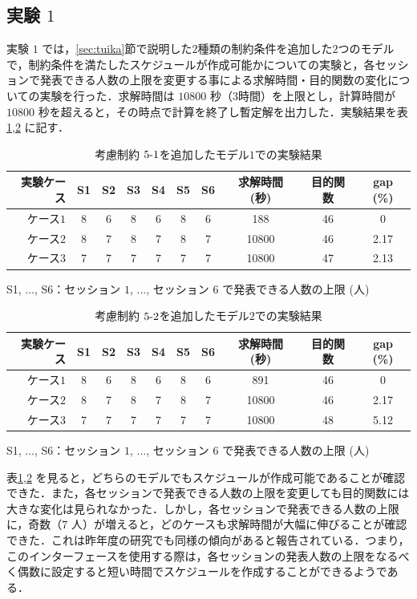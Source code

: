 \documentclass[a4paper,12pt,fleqn]{jarticle}
\begin{document}
\subsection{実験 $1$}\label{sec:jikken1}
実験 $1$ では，\ref{sec:tuika}節で説明した$2$種類の制約条件を追加した$2$つのモデルで，制約条件を満たしたスケジュールが作成可能かについての実験と，各セッションで発表できる人数の上限を変更する事による求解時間・目的関数の変化についての実験を行った．求解時間は $10800$ 秒（$3$時間）を上限とし，計算時間が $10800$ 秒を超えると，その時点で計算を終了し暫定解を出力した．実験結果を表 \ref{tb:jikkenx1},\ref{tb:jikkeny1} に記す．
\begin{table}[H]
  \begin{center}
    \caption{考慮制約 $5\mathchar`-1$を追加したモデル$1$での実験結果}
    \label{tb:jikkenx1}
    \begin{tabular}{r|ccccccccc}  \toprule
    実験ケース &  S1 & S2 & S3 & S4 & S5 & S6 & 求解時間 (秒) & 目的関数 & gap (\%) \\ \toprule 
    ケース$1$ &  8 & 6 & 8 & 6 & 8 & 6 & 188 & 46 & 0 \\ \hline
    ケース$2$ & 8 & 7 & 8 & 7 & 8 & 7 & 10800 & 46 & 2.17 \\ \hline
    ケース$3$ & 7 & 7 & 7 & 7 & 7 & 7 & 10800 & 47& 2.13 \\ \bottomrule
      \end{tabular}
  \end{center}
  S1, ..., S6：セッション $1$, ..., セッション $6$ で発表できる人数の上限 (人)
\end{table}

\begin{table}[H]
  \begin{center}
    \caption{考慮制約 $5\mathchar`-2$を追加したモデル$2$での実験結果}
    \label{tb:jikkeny1}
    \begin{tabular}{r|ccccccccc} \toprule
     実験ケース & S1 & S2 & S3 & S4 & S5 & S6 & 求解時間 (秒) & 目的関数 & gap (\%) \\ \toprule
     ケース$1$ & 8 & 6 & 8 & 6 & 8 & 6 & 891 & 46 & 0 \\ \hline
     ケース$2$ & 8 & 7 & 8 & 7 & 8 & 7 & 10800 & 46 & 2.17 \\ \hline
     ケース$3$ & 7 & 7 & 7 & 7 & 7 & 7 & 10800 & 48  & 5.12 \\ \bottomrule
      \end{tabular}
  \end{center}
  S1, ..., S6：セッション $1$, ..., セッション $6$ で発表できる人数の上限 (人)
\end{table}
 表\ref{tb:jikkenx1},\ref{tb:jikkeny1} を見ると，どちらのモデルでもスケジュールが作成可能であることが確認できた．また，各セッションで発表できる人数の上限を変更しても目的関数には大きな変化は見られなかった．しかし，各セッションで発表できる人数の上限に，奇数（$7$ 人）が増えると，どのケースも求解時間が大幅に伸びることが確認できた．これは昨年度の研究\cite{wakabayasi}でも同様の傾向があると報告されている．つまり，このインターフェースを使用する際は，各セッションの発表人数の上限をなるべく偶数に設定すると短い時間でスケジュールを作成することができるようである．
\end{document}
